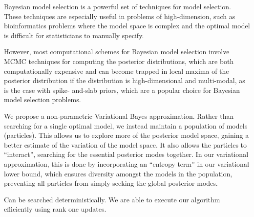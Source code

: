 \documentclass{amsart}[12pt]
\begin{document}
Bayesian model selection is a powerful set of techniques for model selection. These techniques are especially
useful in problems of high-dimension, such as bioinformatics problems where the model space is complex and
the optimal model is difficult for statisticians to manually specify.

However, most computational schemes for Bayesian model selection involve MCMC techniques for computing the
posterior distributions, which are both computationally expensive and can become trapped in local maxima of
the posterior distribution if the distribution is high-dimensional and multi-modal, as is the case with spike-
and-slab priors, which are a popular choice for Bayesian model selection problems.

We propose a non-parametric Variational Bayes approximation.
Rather than searching for a single optimal model, we instead maintain a population of models (particles). This
allows us to explore more of the posterior model space, gaining a better estimate of the variation of the
model space. It also allows the particles to ``interact'', searching for the essential posterior modes
together. In our variational approximation, this is done by incorporating an ``entropy term'' in our
variational lower bound, which ensures diversity amongst the models in the population, preventing all particles
from simply seeking the global posterior modes.

Can be searched deterministically.
We are able to execute our algorithm efficiently using rank one updates.



\end{document}
